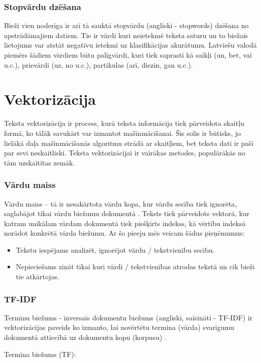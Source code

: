 \subsubsection{Stopvārdu dzēšana}
Bieži vien noderīga ir arī tā sauktā stopvārdu (angliski - stopwords) dzēšana no apstrādāmajiem datiem. Tie ir vārdi kuri neietekmē teksta saturu un to biežais lietojums var atstāt negatīvu ietekmi uz klasifikācijas akurātumu. Latviešu valodā piemērs šādiem vārdiem būtu palīgvārdi, kuri tiek saprasti kā saikļi (un, bet, vai u.c.), prievārdi (uz, no u.c.), partikulas (arī, diezin, gan u.c.).

\section{Vektorizācija}
Teksta vektorizācija ir process, kurā teksta informācija tiek pārveidota skaitļu formā, ko tālāk savukārt var izmantot mašīnmācīšanai. Šis solis ir būtisks, jo lielākā daļa mašīnmācīšanās algoritmu strādā ar skaitļiem, bet teksta dati ir paši par sevi neskaitliski. Teksta vektorizācijai ir vairākas metodes, populārākās no tām uzskaitītas zemāk.

\subsubsection{Vārdu maiss}
Vārdu maiss – tā ir nesakārtota vārdu kopa, kur vārdu secība tiek ignorēta, saglabājot tikai vārdu biežumu dokumentā \cite{speechandlanguageproc}. Teksts tiek pārveidots vektorā, kur katram unikālam vārdam dokumentā tiek piešķirts indekss, kā vērtību indeksā norādot konkrētā vārda biežumu. Ar šo pieeju mēs veicam šādus pieņēmumus:
\begin{itemize}
\item Tekstu iespējams analizēt, ignorējot vārdu / tekstvienību secību.
\item Nepieciešams zināt tikai kuri vārdi / tekstvienības atrodas tekstā un cik bieži tie atkārtojas.
\end{itemize}

\subsubsection{TF-IDF}
Terminu biežums - inversais dokumentu biežums (angliski, saīsināti - TF-IDF) ir vektorizācijas paveids ko izmanto, lai novērtētu termina (vārda) svarīgumu dokumentā attiecībā uz dokumentu kopu (korpusu) \cite{manning_raghavan_schutze_2008}. 

Termina biežums (TF):

